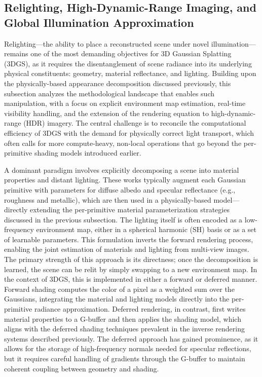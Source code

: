 \documentclass[11pt,a4paper]{article}
\begin{document}
\subsection{Relighting, High-Dynamic-Range Imaging, and Global Illumination Approximation}


Relighting---the ability to place a reconstructed scene under novel illumination---remains one of the most demanding objectives for 3D Gaussian Splatting (3DGS), as it requires the disentanglement of scene radiance into its underlying physical constituents: geometry, material reflectance, and lighting. Building upon the physically-based appearance decomposition discussed previously, this subsection analyzes the methodological landscape that enables such manipulation, with a focus on explicit environment map estimation, real-time visibility handling, and the extension of the rendering equation to high-dynamic-range (HDR) imagery. The central challenge is to reconcile the computational efficiency of 3DGS with the demand for physically correct light transport, which often calls for more compute-heavy, non-local operations that go beyond the per-primitive shading models introduced earlier. \cite{arxiv:2511.19294v1,arxiv:2511.16980v1}

A dominant paradigm involves explicitly decomposing a scene into material properties and distant lighting. These works typically augment each Gaussian primitive with parameters for diffuse albedo and specular reflectance (e.g., roughness and metallic), which are then used in a physically-based model---directly extending the per-primitive material parameterization strategies discussed in the previous subsection. The lighting itself is often encoded as a low-frequency environment map, either in a spherical harmonic (SH) basis or as a set of learnable parameters. This formulation inverts the forward rendering process, enabling the joint estimation of materials and lighting from multi-view images. The primary strength of this approach is its directness; once the decomposition is learned, the scene can be relit by simply swapping to a new environment map. In the context of 3DGS, this is implemented in either a forward or deferred manner. Forward shading computes the color of a pixel as a weighted sum over the Gaussians, integrating the material and lighting models directly into the per-primitive radiance approximation. Deferred rendering, in contrast, first writes material properties to a G-buffer and then applies the shading model, which aligns with the deferred shading techniques prevalent in the inverse rendering systems described previously. The deferred approach has gained prominence, as it allows for the storage of high-frequency normals needed for specular reflections, but it requires careful handling of gradients through the G-buffer to maintain coherent coupling between geometry and shading.
\end{document}
